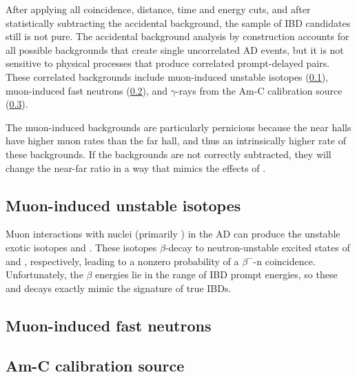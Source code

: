 After applying all coincidence, distance, time and energy cuts,
and after statistically subtracting the accidental background,
the sample of IBD candidates still is not pure.
The accidental background analysis by construction accounts for
all possible backgrounds that create single uncorrelated AD events,
but it is not sensitive to physical processes that produce
correlated prompt-delayed pairs.
These correlated backgrounds include muon-induced unstable isotopes (\cref{subsec:li9}),
muon-induced fast neutrons (\cref{subsec:fastn}),
and $\gamma$-rays from the Am-C calibration source (\cref{subsec:amc}).

The muon-induced backgrounds are particularly pernicious
because the near halls have higher muon rates than the far hall,
and thus an intrinsically higher rate of these backgrounds.
If the backgrounds are not correctly subtracted,
they will change the near-far ratio in a way that mimics the effects of \thetaot.

\subsection{Muon-induced unstable isotopes}
\label{subsec:li9}

Muon interactions with nuclei (primarily ) in the AD
can produce the unstable exotic isotopes \li and \he.
These isotopes $\beta$-decay to neutron-unstable excited states
of  and , respectively,
leading to a nonzero probability of a $\beta^{-}$-n coincidence.
Unfortunately, the $\beta$ energies lie in the range of IBD prompt energies,
so these \li and \he decays exactly mimic the signature of true IBDs.


\subsection{Muon-induced fast neutrons}
\label{subsec:fastn}

\subsection{Am-C calibration source}
\label{subsec:amc}
